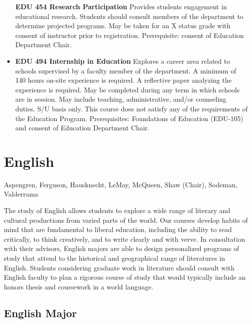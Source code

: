 \documentclass[
  letterpaper,
]{scrbook}
\begin{document}
\begin{itemize}
  \textbf{EDU 454 Research Participation} Provides students engagement
  in educational research. Students should consult members of the
  department to determine projected programs. May be taken for an X
  status grade with consent of instructor prior to registration.
  Prerequisite: consent of Education Department Chair.\\
\item
  \textbf{EDU 494 Internship in Education} Explores a career area
  related to schools supervised by a faculty member of the department. A
  minimum of 140 hours on-site experience is required. A reflective
  paper analyzing the experience is required. May be completed during
  any term in which schools are in session. May include teaching,
  administrative, and/or counseling duties. S/U basis only. This course
  does not satisfy any of the requirements of the Education Program.
  Prerequisites: Foundations of Education (EDU-105) and consent of
  Education Department Chair.
\end{itemize}

\section{English}\label{sec-english}

Aspengren, Ferguson, Hausknecht, LeMay, McQueen, Shaw (Chair), Sodeman,
Valderrama

The study of English allows students to explore a wide range of literary
and cultural productions from varied parts of the world. Our courses
develop habits of mind that are fundamental to liberal education,
including the ability to read critically, to think creatively, and to
write clearly and with verve. In consultation with their advisors,
English majors are able to design personalized programs of study that
attend to the historical and geographical range of literatures in
English. Students considering graduate work in literature should consult
with English faculty to plan a rigorous course of study that would
typically include an honors thesis and coursework in a world language.

\subsection{English Major}\label{english-major}
\end{document}
